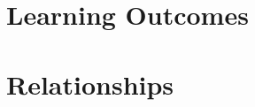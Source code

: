 \documentclass[
10pt, %
a4paper, %
oneside, %
headinclude,footinclude, %
BCOR5mm, %
]{scrartcl}
\begin{document}


\section{Learning Outcomes}



\section{Relationships}









% 


\end{document}
